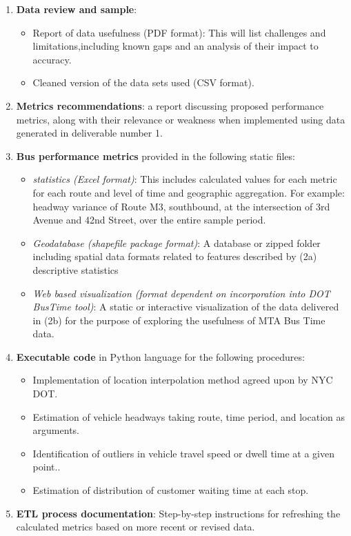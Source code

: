 \documentclass[12pt]{report}
\begin{document}
\begin{enumerate}
\item \textbf{Data review and sample}:

\begin{itemize}
\item Report of data usefulness (PDF format): This will list challenges and limitations,including known gaps and an analysis of their impact to accuracy.
\item Cleaned version of the data sets used (CSV format).

\end{itemize}

\item \textbf{Metrics recommendations}: a report discussing proposed performance metrics, along with their relevance or weakness when implemented using data generated in deliverable number 1. 

\item \textbf{Bus performance metrics} provided in the following static files:

\begin{itemize}
\item \textit{statistics (Excel format)}: This includes calculated values for each metric for each route and level of time and geographic aggregation.  For example: headway variance of Route M3, southbound, at the intersection of 3rd Avenue and 42nd Street, over the entire sample period.
\item \textit{Geodatabase (shapefile package format)}: A database or zipped folder including spatial data formats related to features described by (2a) descriptive statistics
\item \textit{Web based visualization (format dependent on incorporation into DOT BusTime tool)}: A static or interactive visualization of the data delivered in (2b) for the purpose of exploring the usefulness of MTA Bus Time data.


\end{itemize}

\item \textbf{Executable code} in Python language for the following procedures:

\begin{itemize}
\item Implementation of location interpolation method agreed upon by NYC DOT.
\item Estimation of vehicle headways taking route, time period, and location as arguments.
\item Identification of outliers in vehicle travel speed or dwell time at a given point..
\item Estimation of distribution of customer waiting time at each stop.

\end{itemize}

\item \textbf{ETL process documentation}: Step-by-step instructions for refreshing the calculated metrics based on more recent or revised data.
\end{enumerate}
\end{document}

